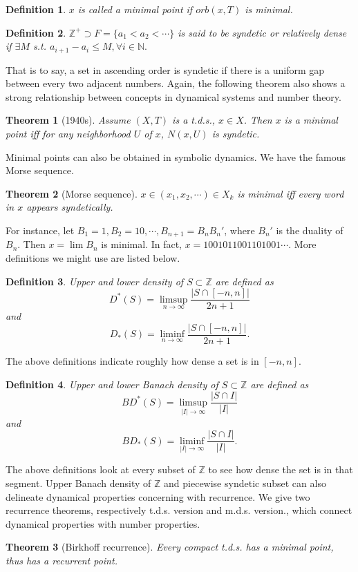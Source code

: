 \documentclass[12pt]{article}
\newtheorem{definition}{Definition}
\newtheorem{theorem}{Theorem}
\begin{document}
\begin{definition}
$x$ is called a minimal point if $orb(x,T) $ is minimal.
\end{definition}
\begin{definition}
$\mathbb{Z}^+\supset F= \{a_1<a_2<\cdots \}$ is said to be syndetic or relatively dense if $\exists M $ s.t. $a_{i+1}-a_i\le M,\forall i\in \mathbb{N.} $
\end{definition}
That is to say, a set in ascending order is syndetic if there is a uniform gap between every two adjacent numbers. Again, the following theorem also shows a strong relationship between concepts in dynamical systems and number theory.
\begin{theorem}[1940s]
Assume $(X,T)$ is a t.d.s., $x\in X$. Then $x$ is a minimal point iff for any neighborhood $U$ of $x$, $N(x,U) $ is syndetic.
\end{theorem}
Minimal points can also be obtained in symbolic dynamics. We have the famous Morse sequence.
\begin{theorem}[Morse sequence]
$x\in (x_1,x_2,\cdots)\in X_k$ is minimal iff every word in $x$ appears syndetically.
\end{theorem}
For instance, let $B_1=1, B_2=10,\cdots,B_{n+1}=B_nB_n'$, where $B_n'$ is the duality of $B_n$. Then $x=\lim B_n$ is minimal. In fact, $x=1001011001101001\cdots. $
More definitions we might use are listed below.
\begin{definition}
Upper and lower density of $S\subset \mathbb{Z}$ are defined as \[D^*(S)=\limsup_{n\to \infty}\frac{|S\cap [-n,n]|}{2n+1} \] and \[D_*(S)=\liminf_{n\to \infty}\frac{|S\cap[-n,n]|}{2n+1} .\]
\end{definition}
The above definitions indicate roughly how dense a set is in $[-n,n] $.
\begin{definition}
Upper and lower Banach density of $S\subset\mathbb{Z}$ are defined as \[BD^*(S)=\limsup_{|I|\to\infty}\frac{|S\cap I|}{|I|} \] and \[BD_*(S)=\liminf_{|I|\to\infty}\frac{|S\cap I|}{|I|}. \]
\end{definition}
The above definitions look at every subset of $\mathbb{Z}$ to see how dense the set is in that segment. Upper Banach density of $\mathbb{Z} $ and piecewise syndetic subset can also delineate dynamical properties concerning with recurrence. We give two recurrence theorems, respectively t.d.s. version and m.d.s. version., which connect dynamical properties with number properties.
\begin{theorem}[Birkhoff recurrence]
Every compact t.d.s. has a minimal point, thus has a recurrent point.
\end{theorem}
\end{document}

